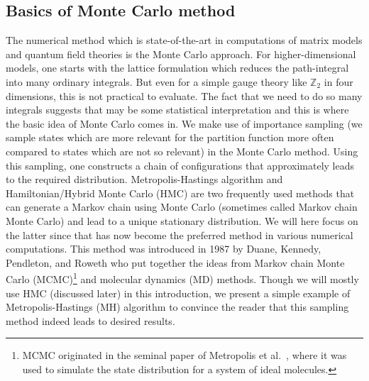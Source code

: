 \documentclass[letter,11pt]{article}
\begin{document}
\subsection{Basics of Monte Carlo method}
The numerical method which is state-of-the-art in computations of matrix models and quantum field theories is the Monte Carlo approach. For higher-dimensional models, one starts with the lattice formulation which reduces the path-integral into many ordinary integrals. But even for a simple
gauge theory like $\mathbb{Z}_{2}$ in four dimensions, this is not practical to evaluate. 
The fact that we need to do so many integrals suggests that may be some statistical 
interpretation and this is where the basic idea of Monte Carlo comes in. We make use of
importance sampling (we sample states which are more relevant for the partition function more often compared to states which are not so relevant) in the Monte Carlo
method. Using this sampling, one constructs a chain of configurations that approximately leads to the required distribution. Metropolis-Hastings algorithm and Hamiltonian/Hybrid Monte Carlo (HMC) 
are two frequently used methods that can generate a Markov chain using Monte Carlo (sometimes called Markov chain Monte Carlo) and lead to a unique stationary distribution. We will here focus on the latter since that has now become the preferred method in various numerical computations. This method was introduced in 1987 by Duane, Kennedy, Pendleton, and Roweth \cite{Duane:1987de} who put together the ideas from Markov chain Monte Carlo (MCMC)\footnote{MCMC originated in the seminal paper of Metropolis et al.~\cite{Metropolis:1953am}, where it was used to simulate the state distribution for a system of ideal molecules.} 
and molecular dynamics (MD) methods. Though we will mostly use HMC (discussed later) in this introduction, we present a
simple example of Metropolis-Hastings (MH) algorithm to convince the reader that this sampling method 
indeed leads to desired results. 
\end{document}
